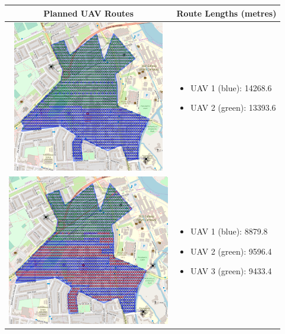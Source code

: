 \begin{table}[h!]
  \centering
  \begin{tabular}{ | c | m{5cm} | }
    \hline
    Planned UAV Routes & Route Lengths (metres) \\
    \hline
    
    \begin{minipage}[c][68mm][c]{.6\textwidth}
      \includegraphics[width=\linewidth, height=66mm]{Chapters/MultiAgentCoverage/MultipleTravellingSalesman/Figs/IrregularRegion/TwoRAV.PNG}
    \end{minipage}
    &
    \begin{itemize}[leftmargin=*]
       \item[] UAV 1 (blue): 14268.6
        \item[] UAV 2 (green): 13393.6
    \end{itemize}
    \\
    \hline
    \begin{minipage}[c][68mm][c]{.6\textwidth}
      \includegraphics[width=\linewidth, height=66mm]{Chapters/MultiAgentCoverage/MultipleTravellingSalesman/Figs/IrregularRegion/ThreeRAV.PNG}
    \end{minipage}
    &
    \begin{itemize}[leftmargin=*]
        \item[] UAV 1 (blue): 8879.8
        \item[] UAV 2 (green): 9596.4
        \item[] UAV 3 (green): 9433.4
    \end{itemize}
    \\
    \hline
    

\end{tabular}
\end{table}
